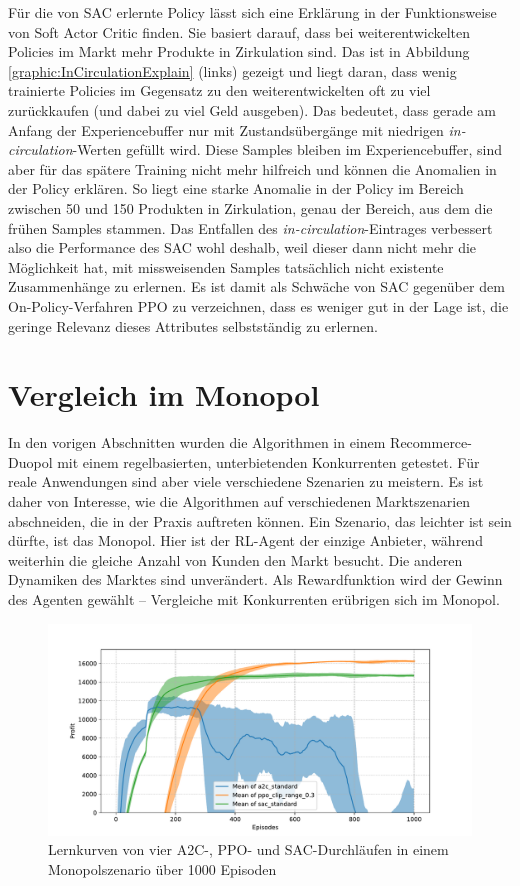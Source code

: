 Für die von SAC erlernte Policy lässt sich eine Erklärung in der Funktionsweise von Soft Actor Critic finden.
Sie basiert darauf, dass bei weiterentwickelten Policies im Markt mehr Produkte in Zirkulation sind.
Das ist in Abbildung \ref{graphic:InCirculationExplain} (links) gezeigt und liegt daran, dass wenig trainierte Policies im Gegensatz zu den weiterentwickelten oft zu viel zurückkaufen (und dabei zu viel Geld ausgeben).
Das bedeutet, dass gerade am Anfang der Experiencebuffer nur mit Zustandsübergänge mit niedrigen \textit{in-circulation}-Werten gefüllt wird.
Diese Samples bleiben im Experiencebuffer, sind aber für das spätere Training nicht mehr hilfreich und können die Anomalien in der Policy erklären.
So liegt eine starke Anomalie in der Policy im Bereich zwischen 50 und 150 Produkten in Zirkulation, genau der Bereich, aus dem die frühen Samples stammen.
Das Entfallen des \textit{in-circulation}-Eintrages verbessert also die Performance des SAC wohl deshalb, weil dieser dann nicht mehr die Möglichkeit hat, mit missweisenden Samples tatsächlich nicht existente Zusammenhänge zu erlernen.
Es ist damit als Schwäche von SAC gegenüber dem On-Policy-Verfahren PPO zu verzeichnen, dass es weniger gut in der Lage ist, die geringe Relevanz dieses Attributes selbstständig zu erlernen.

\section{Vergleich im Monopol}
In den vorigen Abschnitten wurden die Algorithmen in einem Recommerce-Duopol mit einem regelbasierten, unterbietenden Konkurrenten getestet.
Für reale Anwendungen sind aber viele verschiedene Szenarien zu meistern.
Es ist daher von Interesse, wie die Algorithmen auf verschiedenen Marktszenarien abschneiden, die in der Praxis auftreten können.
Ein Szenario, das leichter ist sein dürfte, ist das Monopol.
Hier ist der RL-Agent der einzige Anbieter, während weiterhin die gleiche Anzahl von Kunden den Markt besucht.
Die anderen Dynamiken des Marktes sind unverändert.
Als Rewardfunktion wird der Gewinn des Agenten gewählt -- Vergleiche mit Konkurrenten erübrigen sich im Monopol.

\begin{figure}[htb]
	\centering
	\includegraphics[width=\textwidth]{main/comparison_monopoly.pdf}
	\caption{Lernkurven von vier A2C-, PPO- und SAC-Durchläufen in einem Monopolszenario über 1000 Episoden}
	\label{graphic:MonopolyComparison}
\end{figure}

